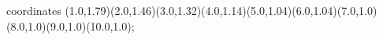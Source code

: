 					coordinates { (1.0,1.79)(2.0,1.46)(3.0,1.32)(4.0,1.14)(5.0,1.04)(6.0,1.04)(7.0,1.0)(8.0,1.0)(9.0,1.0)(10.0,1.0)};